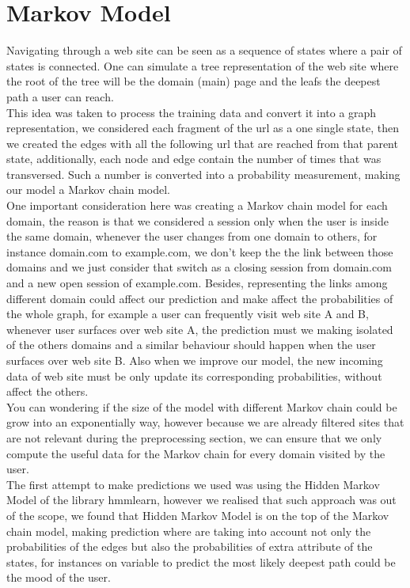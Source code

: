 \section{Markov Model}\label{sec:models}

Navigating through a web site can be seen as a sequence of states where a pair of states is connected. One can simulate a tree representation of the web site where the root of the tree will be the domain (main) page and the leafs the deepest path a user can reach.
\\[2ex]
This idea was taken to process the training data and convert it into a graph representation, we considered each fragment of the url as a one single state, then we created the edges with all the following url that are reached from that parent state, additionally, each node and edge contain the number of times that was transversed.  Such a number is converted into a probability measurement, making our model a Markov chain model.
\\[2ex]
One important consideration here was creating a Markov chain model for each domain, the reason is that we considered a session only when the user is inside the same domain, whenever the user changes from one domain to others, for instance domain.com to example.com, we don’t keep the the link between those domains and we just consider that switch as a closing session from domain.com and a new open session of example.com. Besides, representing the links among different domain could affect our prediction and make affect the probabilities of the whole graph, for example a user can frequently visit web site A and B, whenever user surfaces over web site A, the prediction must we making isolated of the others domains and a similar behaviour should happen when the user surfaces over web site B. Also when we improve our model, the new incoming data of web site must be only update its corresponding probabilities, without affect the others.
\\[2ex]
You can wondering if the size of the model with different Markov chain could be grow into an exponentially way, however because we are already filtered sites that are not relevant during the preprocessing section, we can ensure that we only compute the useful data for the Markov chain for every domain visited by the user.
\\[2ex]
The first attempt to make predictions we used was using the Hidden Markov Model of the library hmmlearn, however we realised that such approach was out of the scope, we found that Hidden Markov Model is on the top of the Markov chain model, making prediction where are taking into account not only the probabilities of the edges but also the probabilities of extra attribute of the states, for instances on variable to predict the most likely deepest path could be the mood of the user.
